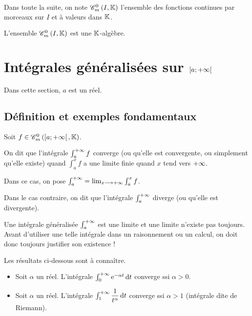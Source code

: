 Dans toute la suite, on note \(\contm[I]\) l'ensemble des fonctions continues par morceaux sur \(I\) et à valeurs dans \(\mathbb{K}\).

\begin{prop}
L'ensemble \(\contm[I]\) est une \(\mathbb{K}\)-algèbre.
\end{prop}

\section{Intégrales généralisées sur \(\left[a;+\infty\right[\)}

Dans cette section, \(a\) est un réel.

\subsection{Définition et exemples fondamentaux}

\begin{defi}
Soit \(f\in\contm[\intervie{a}{\pinf}]\).

On dit que l'intégrale \(\int_a^{+\infty}f\) converge (ou qu'elle est convergente, ou simplement qu'elle existe) quand \(\int_a^xf\) a une limite finie quand \(x\) tend vers \(+\infty\).

Dans ce cas, on pose \(\int_a^{+\infty}=\lim_{x\longrightarrow+\infty}\int_a^xf\).

Dans le cas contraire, on dit que l'intégrale \(\int_a^{+\infty}\) diverge (ou qu'elle est divergente).
\end{defi}

\begin{rem}
Une intégrale généralisée \(\int_a^{+\infty}\) est une limite et une limite n'existe pas toujours. Avant d'utiliser une telle intégrale dans un raisonnement ou un calcul, on doit donc toujours justifier son existence !
\end{rem}

Les résultats ci-dessous sont à connaître.

\begin{ex}
\begin{itemize}
    \item Soit \(\alpha\) un réel. L'intégrale \(\int_0^{\pinf}\e{-\alpha t}\odif{t}\) converge ssi \(\alpha>0\). \\
    \item Soit \(\alpha\) un réel. L'intégrale \(\int_1^{\pinf}\dfrac{1}{t^\alpha}\odif{t}\) converge ssi \(\alpha>1\) (intégrale dite de Riemann).
\end{itemize}
\end{ex}

